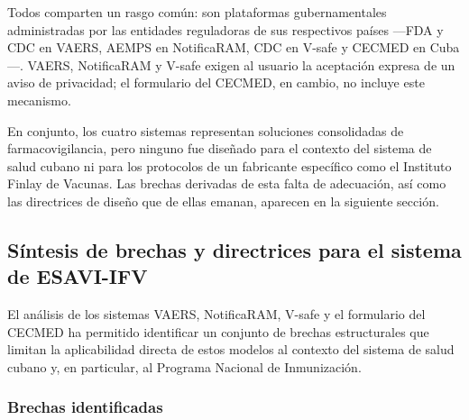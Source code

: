 Todos comparten un rasgo común: son plataformas gubernamentales administradas por las entidades reguladoras de sus respectivos países —FDA y CDC en VAERS, AEMPS en NotificaRAM, CDC en V-safe y CECMED en Cuba—. VAERS, NotificaRAM y V-safe exigen al usuario la aceptación expresa de un aviso de privacidad; el formulario del CECMED, en cambio, no incluye este mecanismo.

En conjunto, los cuatro sistemas representan soluciones consolidadas de farmacovigilancia, pero ninguno fue diseñado para el contexto del sistema de salud cubano ni para los protocolos de un fabricante específico como el Instituto Finlay de Vacunas.
Las brechas derivadas de esta falta de adecuación, así como las directrices de diseño que de ellas emanan, aparecen en la siguiente sección.



\subsection{Síntesis de brechas y directrices para el sistema de ESAVI-IFV}


El análisis de los sistemas VAERS, NotificaRAM, V-safe y el formulario del CECMED ha permitido identificar un conjunto de brechas estructurales que limitan la aplicabilidad directa de estos modelos al contexto del sistema de salud cubano y, en particular, al Programa Nacional de Inmunización.

\subsubsection{Brechas identificadas}

